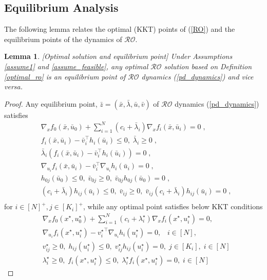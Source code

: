 \documentclass[journal,twoside,web]{ieeecolor}
\newcommand{\rev}[1]{\textcolor{revisionblue}{#1}}
\newtheorem{lemma}{Lemma}
\begin{document}
\subsection*{\rev{Equilibrium Analysis}} \label{kkt<=>eq.sec}
 The following lemma relates the optimal (KKT) points of (\ref{RO}) and the equilibrium points of the dynamics of $\mathcal{RO}$.
\begin{lemma}\label{kkttoeq.lem}[Optimal solution and equilibrium point]
Under Assumptions \ref{assume1} and \ref{assume_feasible}, any optimal $\mathcal{RO}$ solution based on Definition \ref{optimal_ro} is an equilibrium point of $\mathcal{RO}$ dynamics (\ref{pd_dynamics}) and vice versa.
\end{lemma}
\begin{proof}
Any equilibrium point, $\bar{z}=(\bar{x},\bar{\lambda},\bar{u},\bar{v})$  of $\mathcal{RO}$ dynamics (\ref{pd_dynamics}) satisfies
\begin{align*}
&\nabla_x f_0(\bar x,\bar{u}_0)+  \sum_{i=1}^N (c_i+\bar \lambda_i) \nabla_x f_i(\bar x,\bar u_i)=0\;,\\
&f_{i}(\bar x,\bar u_i)-\bar v_i^\top h_i(\bar u_i)\leq 0,\;\bar \lambda_i\geq 0\;,\\
&\bar \lambda_i(f_{i}(\bar x,\bar u_i)-\bar v_i^\top h_i(\bar u_i))=0\;,\\
&\nabla_{u_i} f_i(\bar x,\bar u_i)-\bar v_i^\top \nabla_{u_i} h_i(\bar u_i)=0\;,\\
&h_{0j}(\bar u_0)\leq 0,\; \bar v_{0j}\geq 0,\;\bar v_{0j}h_{0j}(\bar u_0)=0\;,\\
& (c_i+\bar{\lambda}_i) h_{ij}(\bar u_i)\leq 0,\; \bar v_{ij}\geq 0,\;\bar v_{ij}(c_i+\bar \lambda_i) h_{ij}(\bar u_i)=0\;,\\
\end{align*}
for $i\in[N]^+,j\in[K_i]^+$, while any optimal point satisfies below KKT conditions
\begin{align}
    &\nabla_x f_0(x^\star,u_0^\star)+  \sum_{i=1}^N(c_i+\lambda^\star_i) \nabla_x f_i(x^\star,u_i^\star)=0, \label{kkt1_proof} \\
    &\nabla_{u_i} f_i(x^\star,u_i^\star)-{v_i^\star}^\top \nabla_{u_i} h_i(u_i^\star)=0, \;\;\; i \in [N], \label{kkt2_proof} \\
    &v_{ij}^\star\geq 0,\; h_{ij}(u_i^\star)\leq 0,\;v_{ij}^\star h_{ij}(u_i^\star)=0, \; j \in [K_i], \; i \in [N] \label{kkt3_proof} \\
    &\lambda_i^\star\geq 0,\;f_{i}(x^\star,u_i^\star)\leq 0,\;\lambda_i^\star f_{i}(x^\star,u_i^\star)=0, \; i \in [N] \label{kkt4_proof}
\end{align}


\end{proof}
\end{document}
